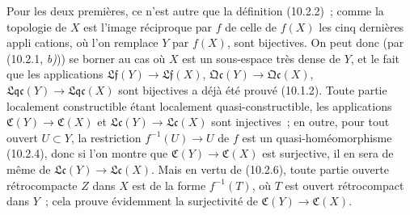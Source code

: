 Pour les deux premières, ce n'est autre que la définition (10.2.2)~; comme la
topologie de $X$ est l'image réciproque par $f$ de celle de $f(X)$ les cinq
dernières appli%
cations, où l'on remplace $Y$ par $f(X)$, sont bijectives. On
peut donc (par (10.2.1, \emph{b)})) se borner au cas où $X$ est un sous-espace
très dense de $Y$, et le fait que les applications
$\mathfrak{Lf}(Y)\to\mathfrak{Lf}(X)$,
$\mathfrak{Qc}(Y)\to\mathfrak{Qc}(X)$,
$\mathfrak{Lqc}(Y)\to\mathfrak{Lqc}(X)$ sont bijectives a déjà été prouvé
(10.1.2). Toute partie localement constructible étant localement
quasi-constructible, les applications $\mathfrak C(Y)\to\mathfrak C(X)$ et
$\mathfrak{Lc}(Y)\to\mathfrak{Lc}(X)$ sont injectives~; en outre, pour tout
ouvert $U\subset Y$, la restriction $f^{-1}(U)\to U$ de $f$ est un
quasi-homéomorphisme (10.2.4), donc si l'on montre que
$\mathfrak C(Y)\to\mathfrak C(X)$ est surjective, il en sera de même de
$\mathfrak{Lc}(Y)\to\mathfrak{Lc}(X)$. Mais en vertu de (10.2.6), toute partie
ouverte rétrocompacte $Z$ dans $X$ est de la forme $f^{-1}(T)$, où $T$ est
ouvert rétrocompact dans $Y$~; cela prouve évidemment la surjectivité de
$\mathfrak C(Y)\to\mathfrak C(X)$.

